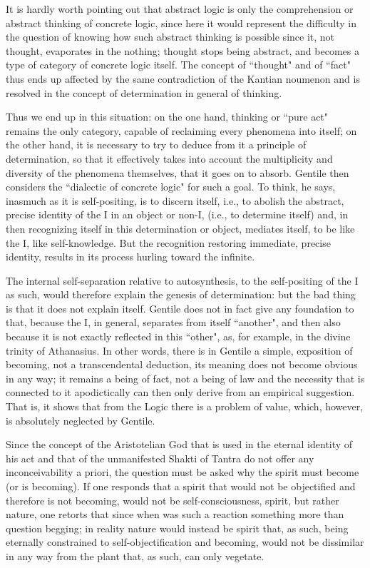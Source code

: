 It is hardly worth pointing out that abstract logic is only the comprehension or abstract thinking of concrete logic, since here it would represent the difficulty in the question of knowing how such abstract thinking is possible since it, not thought, evaporates in the nothing; thought stops being abstract, and becomes a type of category of concrete logic itself. The concept of ``thought" and of ``fact" thus ends up affected by the same contradiction of the Kantian noumenon and is resolved in the concept of determination in general of thinking.

Thus we end up in this situation: on the one hand, thinking or ``pure act" remains the only category, capable of reclaiming every phenomena into itself; on the other hand, it is necessary to try to deduce from it a principle of determination, so that it effectively takes into account the multiplicity and diversity of the phenomena themselves, that it goes on to absorb. Gentile then considers the ``dialectic of concrete logic" for such a goal. To think, he says, inasmuch as it is self-positing, is to discern itself, i.e., to abolish the abstract, precise identity of the I in an object or non-I, (i.e., to determine itself) and, in then recognizing itself in this determination or object, mediates itself, to be like the I, like self-knowledge. But the recognition restoring immediate, precise identity, results in its process hurling toward the infinite.

The internal self-separation relative to autosynthesis, to the self-positing of the I as such, would therefore explain the genesis of determination: but the bad thing is that it does not explain itself. Gentile does not in fact give any foundation to that, because the I, in general, separates from itself ``another", and then also because it is not exactly reflected in this ``other", as, for example, in the divine trinity of Athanasius. In other words, there is in Gentile a simple, exposition of becoming, not a transcendental deduction, its meaning does not become obvious in any way; it remains a being of fact, not a being of law and the necessity that is connected to it apodictically can then only derive from an empirical suggestion. That is, it shows that from the Logic there is a problem of value, which, however, is absolutely neglected by Gentile.

Since the concept of the Aristotelian God that is used in the eternal identity of his act and that of the unmanifested Shakti of Tantra do not offer any inconceivability a priori, the question must be asked why the spirit must become (or is becoming). If one responds that a spirit that would not be objectified and therefore is not becoming, would not be self-consciousness, spirit, but rather nature, one retorts that since when was such a reaction something more than question begging; in reality nature would instead be spirit that, as such, being eternally constrained to self-objectification and becoming, would not be dissimilar in any way from the plant that, as such, can only vegetate.

